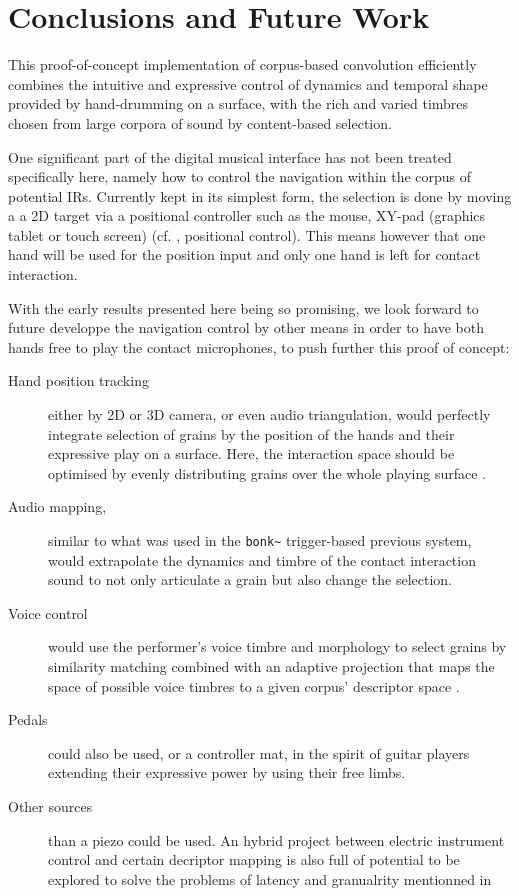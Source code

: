 \section{Conclusions and Future Work}\label{sec:future}

This proof-of-concept implementation of corpus-based convolution efficiently combines the intuitive and expressive control of dynamics and temporal shape provided by hand-drumming on a surface, with the rich and varied timbres chosen from large corpora of sound by content-based selection.


One significant part of the digital musical interface has not been treated specifically here, namely how to control the navigation within the corpus of potential IRs. Currently kept in its simplest form, the selection is done by moving a a 2D target via a positional controller such as the mouse, XY-pad (graphics tablet or touch screen) (cf. \cite{Schwarz-nime2012-sound-space}, positional control).
This means however that one hand will be used for the position input and only one hand is left for contact interaction.

With the early results presented here being so promising, we look forward to future developpe the navigation control by other means in order to have both hands free to play the contact microphones, to push further this proof of concept:

\begin{description}
\item[Hand position tracking] either by 2D or 3D camera, or even audio triangulation, would perfectly integrate selection of grains by the position of the hands and their expressive play on a surface.  Here, the interaction space should be optimised by evenly distributing grains over the whole playing surface \cite{LallemandSchwarz-dafx2011-distribute}.
\item[Audio mapping,] similar to what was used in the \verb|bonk~| trigger-based previous system, would extrapolate the dynamics and timbre of the contact interaction sound to not only articulate a grain but also change the selection.
\item[Voice control] would use the performer's voice timbre and morphology to select grains by similarity matching combined with an adaptive projection that maps the space of possible voice timbres to a given corpus' descriptor space \cite{StowellPlumbley-smc2010-timbre-remapping-regression-tree,Fasciani-si2013b}.
\item[Pedals] could also be used, or a controller mat, in the spirit of guitar players extending their expressive power by using their free limbs.
\item[Other sources] than a piezo could be used. An hybrid project between electric instrument control and certain decriptor mapping is also full of potential to be explored to solve the problems of latency and granualrity mentionned in \cite{TremblaySchwarz-nime2010-surfing-the-waves}
\end{description}

